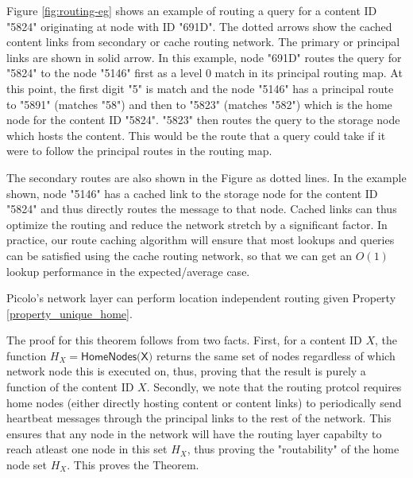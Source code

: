 Figure \ref{fig:routing-eg} shows an example of routing a query for a content ID "5824" originating at node with ID
"691D". The dotted arrows show the cached content links from secondary or cache routing network. The primary or
principal links are shown in solid arrow. In this example, node "691D" routes the query for "5824" to the node "5146"
first as a level 0 match in its principal routing map. At this point, the first digit "5" is match and the node "5146"
has a principal route to "5891" (matches "58") and then to "5823" (matches "582") which is the home node for the content
ID "5824". "5823" then routes the query to the storage node which hosts the content. This would be the route that a
query could take if it were to follow the principal routes in the routing map.

The secondary routes are also shown in the Figure as dotted lines. In the example shown, node "5146" has a cached link
to the storage node for the content ID "5824" and thus directly routes the message to that node. Cached links can thus
optimize the routing and reduce the network stretch by a significant factor.  In practice, our route caching algorithm will
ensure that most lookups and queries can be satisfied using the cache routing network, so that we can get an \(O(1)\) lookup
performance in the expected/average case.


\begin{theorem}
\textsf{Picolo}'s network layer can perform location independent routing given Property \ref{property_unique_home}.
\end{theorem}

The proof for this theorem follows from two facts. First, for a content ID \(X\), the function \(H_X = \textsf{HomeNodes(X)}\) returns
the same set of nodes regardless of which network node this is executed on, thus, proving that the result is purely a function
of the content ID \(X\). Secondly, we note that the routing protcol requires home nodes (either directly hosting content or content links)
to periodically send heartbeat messages through the principal links to the rest of the network. This ensures that any node in the 
network will have the routing layer capabilty to reach atleast one node in this set \(H_X\), thus proving the
"routability" of the home node set \(H_X\). This proves the Theorem. 

